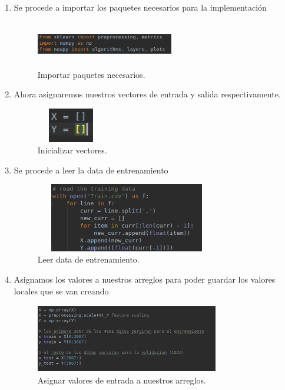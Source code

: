 \documentclass[12pt]{article}
\begin{document}
\begin{enumerate}
\item
Se procede a importar los paquetes necesarios para la implementación
\newline
\begin{figure}[h]
\includegraphics[width=6cm, height=2cm]{rprop_import}
\centering
\caption{Importar paquetes necesarios.}
\label{fig:RPROP_IMPORT}
\end{figure}

\item
 Ahora asignaremos nuestros vectores de entrada y salida respectivamente.
 \begin{figure}[h]
\includegraphics[width=3cm, height=1.5cm]{rprop_init}
\centering
\caption{Inicializar vectores.}
\label{fig:RPROP_INIT}
\end{figure}
\clearpage
\item
Se procede a leer la data de entrenamiento
 \begin{figure}[h]
\includegraphics[width=8cm, height=3cm]{rprop_read}
\centering
\caption{Leer data de entrenamiento.}
\label{fig:RPROP_READ}
\end{figure}

\item
Asignamos los valores a nuestros arreglos para poder guardar los valores locales que se van creando
 \begin{figure}[h]
\includegraphics[width=8cm, height=3cm]{rprop_assign}
\centering
\caption{Asignar valores de entrada a nuestros arreglos.}
\label{fig:RPROP_READ}
\end{figure}


\end{enumerate}
\end{document}
